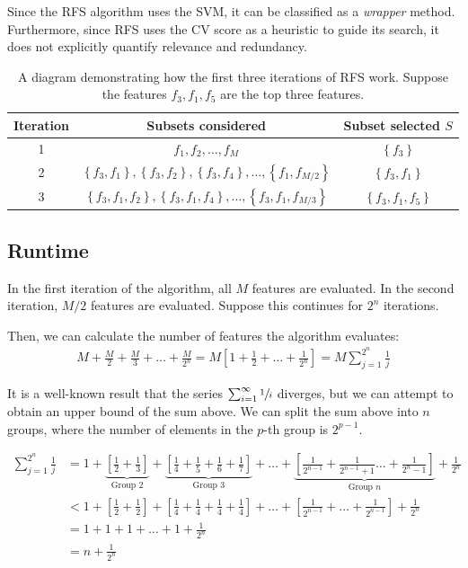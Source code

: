 \documentclass[12pt, twoside, a4paper]{report}
\begin{document}
Since the RFS algorithm uses the SVM, it can be classified as a \textit{wrapper} method. Furthermore, since RFS uses the CV score as a heuristic to guide its search, it does not explicitly quantify relevance and redundancy.


\begin{table}
\centering
    \begin{tabular}{ | c | c | c | }
    \hline
    Iteration & Subsets considered & Subset selected $S$ \\
    \hline
    1 & $f_1, f_2, \dots, f_M$ & $\left\lbrace f_3 \right\rbrace$ \\ \hline
    2 & $\left\lbrace f_3, f_1 \right\rbrace, \left\lbrace f_3, f_2 \right\rbrace, \left\lbrace f_3, f_4 \right\rbrace, \dots , \left\lbrace f_1, f_{M/2} \right\rbrace$ & $\left\lbrace f_3, f_1 \right\rbrace$ \\ \hline
    3 & $\left\lbrace f_3, f_1, f_2 \right\rbrace, \left\lbrace f_3, f_1, f_4 \right\rbrace, \dots , \left\lbrace f_3, f_1, f_{M/3} \right\rbrace$ & $\left\lbrace f_3, f_1, f_5 \right\rbrace$ \\ \hline
    \end{tabular}
\caption{A diagram demonstrating how the first three iterations of RFS work. Suppose the features $f_3, f_1, f_5$ are the top three features.}
\label{body:rfs:example}
\end{table}


\subsection{Runtime}
In the first iteration of the algorithm, all $M$ features are evaluated. In the second iteration, $M/2$ features are evaluated. Suppose this continues for $2^n$ iterations.

Then, we can calculate the number of features the algorithm evaluates:
\begin{align*}
M+\frac{M}{2}+\frac{M}{3}+\dots+\frac{M}{2^n} = M\left[ 1+\frac{1}{2}+\dots+\frac{1}{2^n} \right]=M \sum_{j=1}^{2^n} \frac{1}{j}
\end{align*}

It is a well-known result that the series $\sum_{i=1}^{\infty} \sfrac{1}{i}$ diverges, but we can attempt to obtain an upper bound of the sum above. We can split the sum above into $n$ groups, where the number of elements in the $p$-th group is $2^{p-1}$.

\begin{align*}
\sum_{j=1}^{2^n} \frac{1}{j}
&= 1 + \underbrace{\left[ \frac{1}{2} + \frac{1}{3} \right]}_{\text{Group 2}} + \underbrace{\left[ \frac{1}{4} + \frac{1}{5} + \frac{1}{6} + \frac{1}{7} \right]}_{\text{Group 3}} + \dots + \underbrace{\left[ \frac{1}{2^{n-1}} + \frac{1}{2^{n-1}+1} \dots + \frac{1}{2^{n}-1} \right]}_{\text{Group $n$}} + \frac{1}{2^n} \\
&< 1 + \left[ \frac{1}{2} + \frac{1}{2} \right] + \left[ \frac{1}{4} + \frac{1}{4} + \frac{1}{4} + \frac{1}{4} \right] + \dots + \left[ \frac{1}{2^{n-1}} + \dots + \frac{1}{2^{n-1}} \right] + \frac{1}{2^n} \\
&= 1+1+1+ \dots + 1 + \frac{1}{2^n} \\
&= n + \frac{1}{2^n}
\end{align*}
\end{document}
